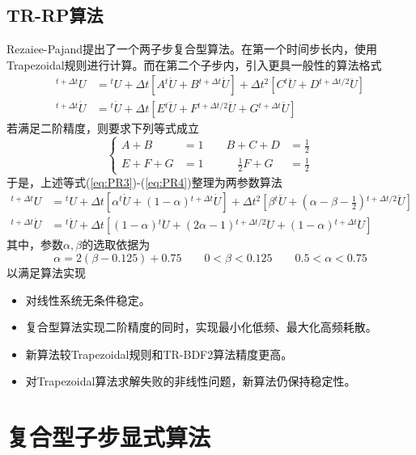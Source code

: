 \subsection{TR-RP算法}
Rezaiee-Pajand提出了一个两子步复合型算法\cite{Rezaiee-Pajand2015a}。在第一个时间步长内，使用Trapezoidal规则进行计算。而在第二个子步内，引入更具一般性的算法格式
\begin{align}
{^{t+\Delta t}\!U}&={^t\!U}+\Delta t[A{^t\!\dot{U}}+B{^{t+\Delta t}\!\dot{U}}]+\Delta t^2[C{^{t}\!\ddot{U}}+D{^{t+\Delta t/2}\!\ddot{U}}]\label{eq:PR3}\\
{^{t+\Delta t}\!\dot{U}}&={^t\!\dot{U}}+\Delta t[E{^t\ddot{U}}+F{^{t+\Delta t/2}\!\ddot{U}}+G{^{t+\Delta t}\!\ddot{U}}]\label{eq:PR4}
\end{align}
若满足二阶精度，则要求下列等式成立
\begin{equation}
\left\{\begin{aligned}
A+B&=1\qquad B+C+D&=\frac{1}{2}\\
E+F+G&=1\qquad\quad \frac{1}{2}F+G&=\frac12
\end{aligned}\right.
\end{equation}
于是，上述等式(\ref{eq:PR3})-(\ref{eq:PR4})整理为两参数算法
\begin{align}
{^{t+\Delta t}\!U}&={^t\!U}+\Delta t[\alpha{^t\!\dot{U}}+(1-\alpha){^{t+\Delta t}\!\dot{U}}]+\Delta t^2[\beta{^{t}\!\ddot{U}}+(\alpha-\beta-\frac{1}{2}){^{t+\Delta t/2}\!\ddot{U}}]\\
{^{t+\Delta t}\!\dot{U}}&={^t\!\dot{U}}+\Delta t[(1-\alpha){^t\ddot{U}}+(2\alpha-1){^{t+\Delta t/2}\!\ddot{U}}+(1-\alpha){^{t+\Delta t}\!\ddot{U}}]
\end{align}
其中，参数$\alpha,\beta$的选取依据为
\begin{equation}
\alpha=2(\beta-0.125)+0.75\qquad 0<\beta<0.125\qquad 0.5<\alpha<0.75
\end{equation}
以满足算法实现
\begin{itemize}
\item[\ddag] 对线性系统无条件稳定。
\item[\ddag] 复合型算法实现二阶精度的同时，实现最小化低频、最大化高频耗散。
\item[\ddag] 新算法较Trapezoidal规则\cite{Hughes2000c}和TR-BDF2算法\cite{Bathe2005a,Bathe2007a,Bathe2012a}精度更高。
\item[\ddag] 对Trapezoidal算法求解失败的非线性问题，新算法仍保持稳定性。
\end{itemize}
\section{复合型子步显式算法}
